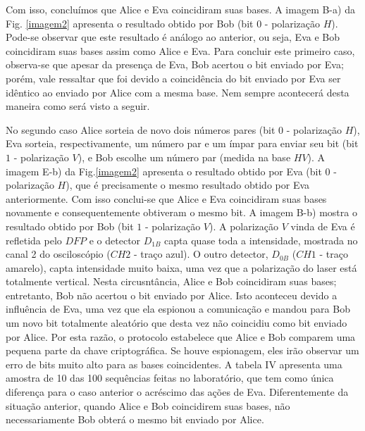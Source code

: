 \documentclass[pra, twocolumn]{revtex4}
\begin{document}
Com isso, conclu\'imos que Alice e Eva coincidiram suas bases. A imagem B-a) da Fig. \ref{imagem2} apresenta o resultado obtido por Bob (bit $0$ - polariza\c c\~ao $H$). Pode-se observar que este resultado \'e an\'alogo ao anterior, ou seja, Eva e Bob coincidiram suas bases assim como Alice e Eva. Para concluir este primeiro caso, observa-se que apesar da presen\c ca de Eva, Bob acertou o bit enviado por Eva; por\'em, vale ressaltar que foi devido a coincid\^encia do bit enviado por Eva ser id\^entico ao enviado por Alice com a mesma base. Nem sempre acontecer\'a desta maneira como ser\'a visto a seguir.

No segundo caso Alice sorteia de novo dois n\'umeros pares (bit $0$ - polariza\c c\~ao $H$), Eva sorteia, respectivamente, um n\'umero par e um \'impar para enviar seu bit (bit $1$ - polariza\c c\~ao $V$), e Bob escolhe um n\'umero par (medida na base $HV$). A imagem E-b) da Fig.\ref{imagem2} apresenta o resultado obtido por Eva (bit $0$ - polariza\c c\~ao $H$), que \'e precisamente o mesmo resultado obtido por Eva anteriormente. Com isso conclui-se que Alice e Eva coincidiram suas bases novamente e consequentemente obtiveram o mesmo bit. A imagem B-b) mostra o resultado obtido por Bob (bit $1$ - polariza\c c\~ao $V$). A polariza\c c\~ao $V$ vinda de Eva \'e refletida pelo $DFP$ e o detector $D_{1B}$ capta quase toda a intensidade, mostrada no canal 2 do oscilosc\'opio ($CH2$ - tra\c co azul). O outro detector, $D_{0B}$ ($CH1$ - tra\c co amarelo), capta intensidade muito baixa, uma vez que a polariza\c c\~ao do laser est\'a totalmente vertical. Nesta circusnt\^ancia, Alice e Bob coincidiram suas bases; entretanto, Bob n\~ao acertou o bit enviado por Alice. Isto aconteceu devido a influ\^encia de Eva, uma vez que ela espionou a comunica\c c\~ao e mandou para Bob um novo bit totalmente aleat\'orio que desta vez n\~ao coincidiu como bit enviado por Alice. Por esta raz\~ao, o protocolo estabelece que Alice e Bob comparem uma pequena parte da chave criptogr\'afica. Se houve espionagem, eles ir\~ao observar um erro de bits muito alto para as bases coincidentes. A tabela IV apresenta uma amostra de 10 das 100 sequ\^encias feitas no laborat\'orio, que tem como \'unica diferen\c ca para o caso anterior o acr\'escimo das a\c c\~oes de Eva. Diferentemente da situa\c c\~ao anterior, quando Alice e Bob coincidirem suas bases, n\~ao necessariamente Bob obter\'a o mesmo bit enviado por Alice.
\end{document}
